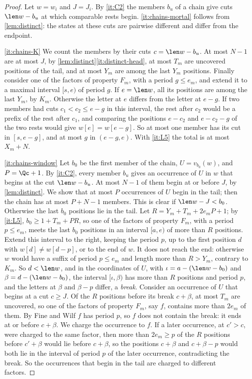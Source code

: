 \begin{proof}
Let $w=w_i$ and $J=J_i$. By \ref{it:C2} the members $b_u$ of a
chain give cuts $\len w-b_u$ at which comparable rests begin.
\eqref{it:chains-mortal} follows from \cref{lem:distinct}: the states at
these cuts are pairwise different and differ from the endpoint.

\eqref{it:chains-K} We count the members by their cuts $c=\len w-b_u$. At most
$N-1$ are at most $J$, by \cref{lem:distinct}\eqref{it:distinct-head}, at most $T_m$ are uncovered positions of the tail, and at most $Y_m$ are
among the last $Y_m$ positions. Finally consider one of the factors of property $F_m$, with a period
$g\le e_m$, and extend it to a maximal interval $[s,e)$ of period $g$. If
$e=\len w$, all its positions are among the last $Y_m$, by $K_m$. Otherwise the letter at
$e$ differs from the letter at $e-g$. If two members had cuts $c_1<c_2\le
e-g$ in this interval, the rest after $c_2$ would be a prefix of the rest
after $c_1$, and comparing the positions $e-c_2$ and $e-c_2-g$ of the two
rests would give $w[e]=w[e-g]$. So at most one member has its cut in
$[s,e-g]$, and at most $g$ in $(e-g,e)$. With \ref{it:L5} the total is at
most $X_m+N$.

\eqref{it:chains-window} Let $b_0$ be the first member of the chain,
$U=v_{b_0}(w)$, and $P=\Qc+1$. By \ref{it:C2}, every member $b_u$ gives an
occurrence of $U$ in $w$ that begins at the cut $\len w-b_u$. At most $N-1$ of
them begin at or before $J$, by \cref{lem:distinct}. We show that at most
$P$ occurrences of $U$ begin in the tail; then the chain has at most
$P+N-1$ members. This is clear if $\len w-J<b_0$. Otherwise the last $b_0$
positions lie in the tail. Let $R=Y_m+T_m+2e_mP+1$; by \ref{it:L5},
$b_0\ge1+T_m+PR$, so one of the factors of property $F_m$, with a period $p\le e_m$,
meets the last $b_0$ positions in an interval $[a,e)$ of more than $R$
positions. Extend this interval to the right, keeping the period $p$, up to
the first position $d$ with $w[d]\ne w[d-p]$, or to the end of $w$. It does
not reach the end: otherwise $w$ would have a suffix of period $p\le e_m$
and length more than $R>Y_m$, contrary to $K_m$. So $d<\len w$, and in the
coordinates of $U$, with $\iota=a-(\len w-b_0)$ and $\beta=d-(\len w-b_0)$, the
interval $[\iota,\beta)$ has more than $R$ positions and period $p$, and the
letters at $\beta$ and $\beta-p$ differ, a \emph{break}.
Consider an occurrence of $U$ that begins at a cut $c\ge J$. Of the $R$
positions before its break $c+\beta$, at most $T_m$ are uncovered, so one
of the factors of property $F_m$, say $f$, contains more than $2e_m$ of them. By Fine and
Wilf $f$ has period $p$, so $f$ does not contain the break: it ends at or
before $c+\beta$. We charge the occurrence to $f$. If a later occurrence, at
$c'>c$, were charged to the same factor, then more than $2e_m\ge p$ of the
$R$ positions before $c'+\beta$ would lie before $c+\beta$, so the
positions $c+\beta$ and $c+\beta-p$ would both lie in the interval of period
$p$ of the later occurrence, contradicting the break. So the occurrences
that begin in the tail are charged to different factors.


\end{proof}
